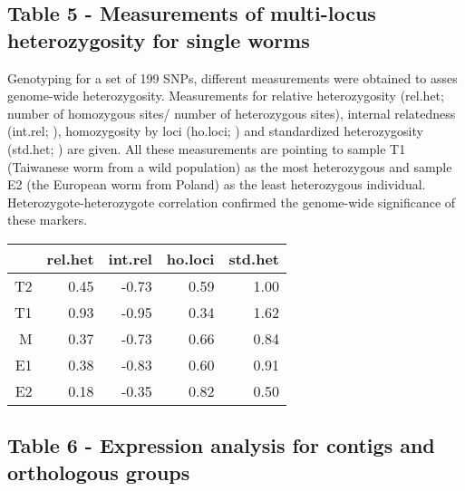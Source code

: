 \documentclass[10pt]{bmc_article}
\newenvironment{bmcformat}{\begin{raggedright}\baselineskip20pt\sloppy\setboolean{publ}{false}}{\end{raggedright}\baselineskip20pt\sloppy}
\begin{document}
\begin{bmcformat}
\subsection{Table 5 - Measurements of multi-locus heterozygosity for
  single worms}

Genotyping for a set of 199 SNPs, different measurements
were obtained to asses genome-wide heterozygosity.  Measurements for
relative heterozygosity (rel.het; number of homozygous sites/ number
of heterozygous sites), internal relatedness (int.rel;
\cite{pmid11571049}), homozygosity by loci (ho.loci;
\cite{pmid17107491}) and standardized heterozygosity (std.het;
\cite{coltman81j}) are given.  All these measurements are pointing to
sample T1 (Taiwanese worm from a wild population) as the most
heterozygous and sample E2 (the European worm from Poland) as the
least heterozygous individual. Heterozygote-heterozygote correlation
\cite{pmid21565077} confirmed the genome-wide significance of these
markers.

\begin{table}[ht]
\begin{center}
\begin{tabular}{rrrrr}
  \hline
 & rel.het & int.rel & ho.loci & std.het \\ 
  \hline
T2 & 0.45 & -0.73 & 0.59 & 1.00 \\ 
  T1 & 0.93 & -0.95 & 0.34 & 1.62 \\ 
  M & 0.37 & -0.73 & 0.66 & 0.84 \\ 
  E1 & 0.38 & -0.83 & 0.60 & 0.91 \\ 
  E2 & 0.18 & -0.35 & 0.82 & 0.50 \\ 
   \hline
\end{tabular}
\end{center}
\end{table}
\subsection{Table 6 - Expression analysis for contigs and orthologous groups}


\end{bmcformat}
\end{document}
